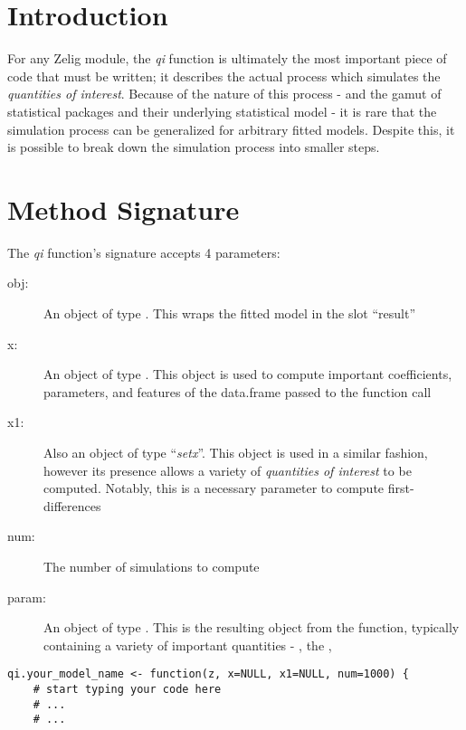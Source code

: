 \section{Introduction}

For any Zelig module, the \emph{qi} function is ultimately the most
important piece of code that must be written; it describes the actual
process which simulates the \emph{quantities of interest}.  Because of
the nature of this process - and the gamut of statistical packages and
their underlying statistical model - it is rare that the simulation
process can be generalized for arbitrary fitted models.  Despite this,
it is possible to break down the simulation process into smaller steps.

\section{ Method Signature}
The \emph{qi} function's signature accepts 4 parameters:
%
%
\begin{description}

	\item[obj:] An object of type .  This wraps the fitted
		model in the slot ``result''
		
	\item[x:] An object of type .  This object is used to compute
		important coefficients, parameters, and features of the data.frame passed to
		the function call

	\item[x1:] Also an object of type ``\emph{setx}''.  This object is used in a
		similar fashion, however its presence allows a variety of \emph{quantities
		of interest} to be computed.  Notably, this is a necessary parameter to
		compute first-differences
	
	\item[num:] The number of simulations to compute

	\item[param:] An object of type . This is the resulting object from
		the  function, typically containing a variety of important quantities
		- , the , \code{}

\end{description}


%
\begin{verbatim}
qi.your_model_name <- function(z, x=NULL, x1=NULL, num=1000) {
	# start typing your code here
	# ...
	# ...
\end{verbatim}



